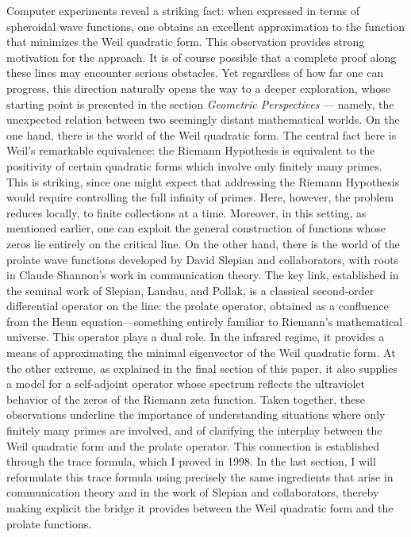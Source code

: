 \documentclass{article}
\begin{document}
Computer experiments reveal a striking fact: when expressed in terms of 
spheroidal wave functions, one obtains an excellent approximation to the 
function that minimizes the Weil quadratic form. This observation provides 
strong motivation for the approach. It is of course possible that a complete 
proof along these lines may encounter serious obstacles. Yet regardless of 
how far one can progress, this direction naturally opens the way to a deeper 
exploration, whose starting point is presented in the section 
\textit{Geometric Perspectives} — namely, the unexpected relation 
between two seemingly distant mathematical worlds.\newline
On the one hand, there is the world of the Weil quadratic form. The central fact here is Weil’s remarkable equivalence: the Riemann Hypothesis is equivalent to the positivity of  certain quadratic forms which involve only finitely many primes. This is striking, since one might expect that addressing the Riemann Hypothesis would require controlling the full infinity of primes. Here, however, the problem reduces locally, to finite collections at a time. Moreover, in this setting, as mentioned earlier, one can exploit the general construction of functions whose zeros lie entirely on the critical line.
 \newline 
 On the other hand, there is the world of the prolate wave functions developed by David Slepian and collaborators, with roots in Claude Shannon’s work in communication theory. The key link, established in the seminal work of Slepian, Landau, and Pollak, is a classical second-order differential operator on the line: the prolate operator, obtained as a confluence from the Heun equation—something entirely familiar to Riemann’s mathematical universe. This operator plays a dual role. In the infrared regime, it provides a means of approximating the minimal eigenvector of the Weil quadratic form. At the other extreme, as explained in the final section of this paper, it also supplies a model for a self-adjoint operator whose spectrum reflects the ultraviolet behavior of the zeros of the Riemann zeta function.
 \newline 
 Taken together, these observations underline the importance of understanding situations where only finitely many primes are involved, and of clarifying the interplay between the Weil quadratic form and the prolate operator. This connection is established through the trace formula, which I proved in 1998. In the last section, I will reformulate this trace formula using precisely the same ingredients that arise in communication theory and in the work of Slepian and collaborators, thereby making explicit the bridge it provides between the Weil quadratic form and the prolate functions.
\end{document}
